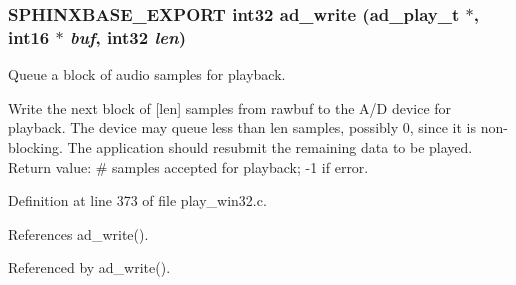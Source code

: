 \subsubsection[{ad\_\-write}]{\setlength{\rightskip}{0pt plus 5cm}SPHINXBASE\_\-EXPORT int32 ad\_\-write (ad\_\-play\_\-t $\ast$, \/  int16 $\ast$ {\em buf}, \/  int32 {\em len})}\label{ad_8h_ea278a0c26051f4fe011778f225ea9c4}


Queue a block of audio samples for playback. 

Write the next block of [len] samples from rawbuf to the A/D device for playback. The device may queue less than len samples, possibly 0, since it is non-blocking. The application should resubmit the remaining data to be played. Return value: \# samples accepted for playback; -1 if error. 

Definition at line 373 of file play\_\-win32.c.

References ad\_\-write().

Referenced by ad\_\-write().